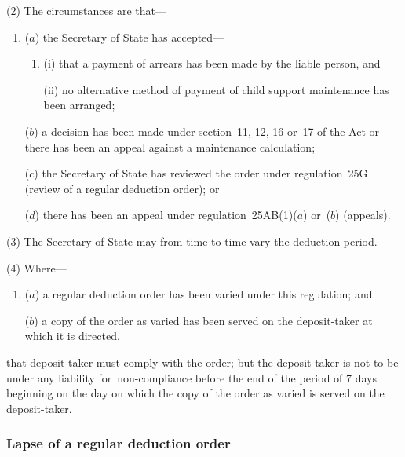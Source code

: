 \documentclass[12pt,a4paper]{article}
\begin{document}
(2) The circumstances are that—
\begin{enumerate}\item[]
($a$) the 
Secretary of State  %
has accepted—
\begin{enumerate}\item[]
(i) that a payment of arrears has been made by the liable person, and

(ii) no alternative method of payment of child support maintenance has been arranged;
\end{enumerate}

($b$) a decision has been made under section~11, 12, 16 or~17 of the Act or there has been an appeal against a maintenance calculation;

($c$) the 
Secretary of State  %
has reviewed the order under regulation~25G (review of a regular deduction order); or

($d$) there has been an appeal under regulation~25AB(1)($a$)  or~($b$)  (appeals).
\end{enumerate}

(3) The 
Secretary of State  %
may from time to time vary the deduction period.

(4) Where—
\begin{enumerate}\item[]
($a$) a regular deduction order has been varied under this regulation; and

($b$) a copy of the order as varied has been served on the deposit-taker at which it is directed,
\end{enumerate}
that deposit-taker must comply with the order; but the deposit-taker is not to be under any liability for~non-compliance before the end of the period of 7 days beginning on the day on which the copy of the order as varied is served on the deposit-taker.


\subsubsection[25J. Lapse of a regular deduction order]{Lapse of a regular deduction order}
\end{document}
